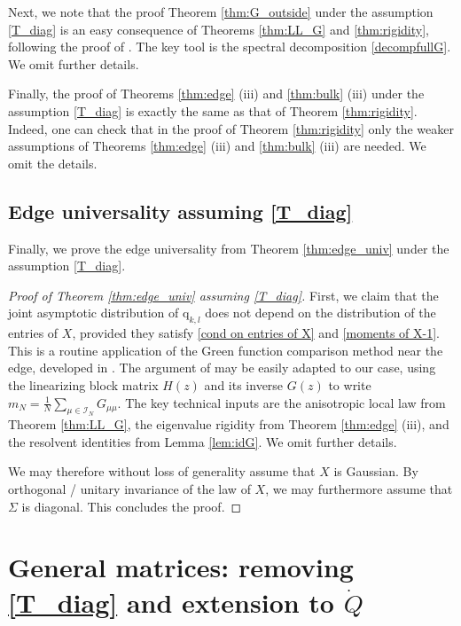 \documentclass[11pt]{article} %
\numberwithin{equation}{section}
\numberwithin{figure}{section}
\theoremstyle{plain} %
\theoremstyle{definition} %
\newcommand{\f}[1]{\boldsymbol{\mathrm{#1}}} %
\renewcommand{\cal}{\mathcal}
\begin{document}
Next, we note that the proof Theorem \ref{thm:G_outside} under the assumption \eqref{T_diag} is an easy consequence of Theorems \ref{thm:LL_G} and \ref{thm:rigidity}, following the proof of \cite[Theorem 3.12]{BEKYY}.  The key tool is the spectral decomposition \eqref{decompfullG}. We omit further details.

Finally, the proof of Theorems \ref{thm:edge} (iii) and \ref{thm:bulk} (iii) under the assumption \eqref{T_diag} is exactly the same as that of Theorem \ref{thm:rigidity}. Indeed, one can check that in the proof of Theorem \ref{thm:rigidity} only the weaker assumptions of Theorems \ref{thm:edge} (iii) and \ref{thm:bulk} (iii) are needed. We omit the details.

\subsection{Edge universality assuming \eqref{T_diag}}

Finally, we prove the edge universality from Theorem \ref{thm:edge_univ} under the assumption \eqref{T_diag}.

\begin{proof}[Proof of Theorem \ref{thm:edge_univ} assuming \eqref{T_diag}]
First, we claim that the joint asymptotic distribution of $\f q_{k,l}$ does not depend on the distribution of the entries of $X$, provided they satisfy \eqref{cond on entries of X} and \eqref{moments of X-1}. This is a routine application of the Green function comparison method near the edge, developed in \cite[Section 6]{EYY3}. The argument of \cite[Section 6]{EYY3} may be easily adapted to our case, using the linearizing block matrix $H(z)$ and its inverse $G(z)$ to write $m_N = \frac{1}{N} \sum_{\mu \in \cal I_N} G_{\mu \mu}$. The key technical inputs are the anisotropic local law from Theorem \ref{thm:LL_G}, the eigenvalue rigidity from Theorem \ref{thm:edge} (iii), and the resolvent identities from Lemma \ref{lem:idG}. We omit further details.

We may therefore without loss of generality assume that $X$ is Gaussian. By orthogonal / unitary invariance of the law of $X$, we may furthermore assume that $\Sigma$ is diagonal. This concludes the proof.
\end{proof}

\section{General matrices: removing \eqref{T_diag} and extension to $\dot Q$}  \label{sec:generalizations}
\end{document}
